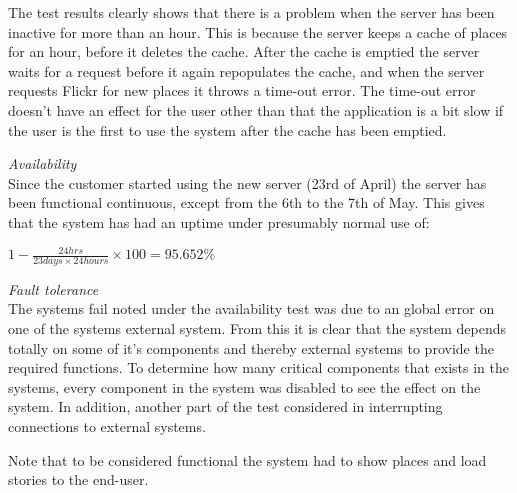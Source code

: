 The test results clearly shows that there is a problem when the server has been inactive for more than an hour. This is because the server keeps a cache of places for an hour, before it deletes the cache. After the cache is emptied the server waits for a request before it again repopulates the cache, and when the server requests Flickr for new places it throws a time-out error. The time-out error doesn't have an effect for the user other than that the application is a bit slow if the user is the first to use the system after the cache has been emptied.

\emph{Availability}\\
Since the customer started using the new server (23rd of April) the server has been functional continuous, except from the 6th to the 7th of May. This gives that the system has had an uptime under presumably normal use of:

$1-\frac{24 hrs}{23 days \times 24 hours} \times 100 = 95.652 \% $

\emph{Fault tolerance}\\
The systems fail noted under the availability test was due to an global error on one of the systems external system. From this it is clear that the system depends totally on some of it's components and thereby external systems to provide the required functions. To determine how many critical components that exists in the systems, every component in the system was disabled to see the effect on the system. In addition, another part of the test considered in interrupting connections to external systems. 

Note that to be considered functional the system had to show places and load stories to the end-user. 

